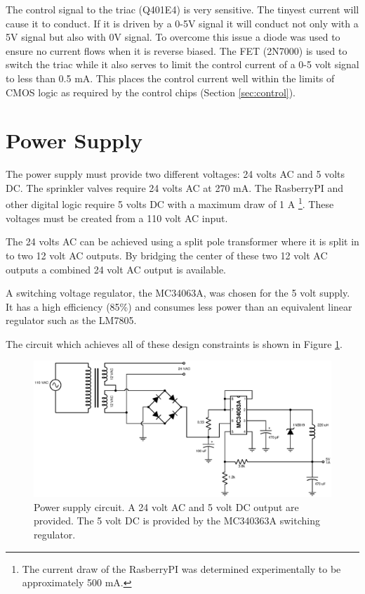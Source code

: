 \documentclass{article}
\begin{document}
The control signal to the triac (Q401E4) is very sensitive.
The tinyest current will cause it to conduct.
If it is driven by a 0-5V signal it will conduct not only
with a 5V signal but also with 0V signal.
To overcome this issue a diode was used to ensure no current
flows when it is reverse biased.
The FET (2N7000) is used to switch the triac while it also
serves to limit the control current of a 0-5 volt signal
to less than 0.5 mA.
This places the control current well within the limits
of CMOS logic as required by the control chips (Section \ref{sec:control}).


\clearpage
\section{Power Supply}
\label{sec:power}

The power supply must provide two different voltages: 24 volts AC and
5 volts DC.
The sprinkler valves require 24 volts AC at 270 mA.
The RasberryPI and other digital logic require 5 volts DC with a
maximum draw of 1 A
\footnote{The current draw of the RasberryPI was determined
experimentally to be approximately 500 mA.}.
These voltages must be created from a 110 volt AC input.

The 24 volts AC can be achieved using a split pole transformer
where it is split in to two 12 volt AC outputs.
By bridging the center of these two 12 volt AC outputs
a combined 24 volt AC output is available.

A switching voltage regulator, the MC34063A, was chosen for
the 5 volt supply.
It has a high efficiency (85\%) and consumes less power than an
equivalent linear regulator such as the LM7805.

The circuit which achieves all of these design constraints is
shown in Figure \ref{fig:power}.

\begin{figure}[hbp]
\centering
\includegraphics[angle=-90,scale=0.95]{xcircuit/power_supply}
\caption{Power supply circuit. A 24 volt AC and 5 volt DC output are
provided.  The 5 volt DC is provided by the MC340363A switching
regulator.}\label{fig:power}
\end{figure}


\pagebreak
\printbibliography
\end{document}
